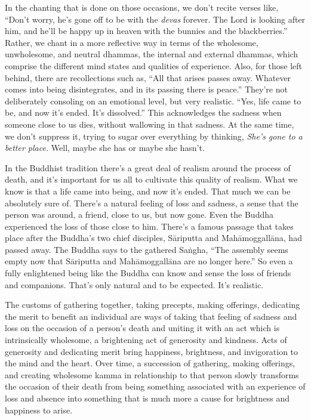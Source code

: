 In the chanting that is done on those occasions, we don't recite verses 
like, ``Don't worry, he's gone off to be with the \emph{devas} forever. 
The Lord is looking after him, and he'll be happy up in heaven with the 
bunnies and the blackberries.'' Rather, we chant in a more reflective 
way in terms of the wholesome, unwholesome, and neutral dhammas, the 
internal and external dhammas, which comprise the different mind states 
and qualities of experience. Also, for those left behind, there are 
recollections such as, ``All that arises passes away. Whatever comes 
into being disintegrates, and in its passing there is peace.'' They're 
not deliberately consoling on an emotional level, but very realistic. 
``Yes, life came to be, and now it's ended. It's dissolved.'' This 
acknowledges the sadness when someone close to us dies, without 
wallowing in that sadness. At the same time, we don't suppress it, 
trying to sugar over everything by thinking, \emph{She's gone to a 
better place.} Well, maybe she has or maybe she hasn't.

In the Buddhist tradition there's a great deal of realism around the 
process of death, and it's important for us all to cultivate this 
quality of realism. What we know is that a life came into being, and 
now it's ended. That much we can be absolutely sure of. There's a 
natural feeling of loss and sadness, a sense that the person was 
around, a friend, close to us, but now gone. Even the Buddha 
experienced the loss of those close to him. There's a famous passage 
that takes place after the Buddha's two chief disciples, Sāriputta and 
Mahāmoggallāna, had passed away. The Buddha says to the gathered 
Saṅgha, ``The assembly seems empty now that Sāriputta and 
Mahāmoggallāna are no longer here.'' So even a fully enlightened 
being like the Buddha can know and sense the loss of friends and 
companions. That's only natural and to be expected. It's realistic.

The customs of gathering together, taking precepts, making offerings, 
dedicating the merit to benefit an individual are ways of taking that 
feeling of sadness and loss on the occasion of a person's death and 
uniting it with an act which is intrinsically wholesome, a brightening 
act of generosity and kindness. Acts of generosity and dedicating merit 
bring happiness, brightness, and invigoration to the mind and the 
heart. Over time, a succession of gathering, making offerings, and 
creating wholesome kamma in relationship to that person slowly 
transforms the occasion of their death from being something associated 
with an experience of loss and absence into something that is much more 
a cause for brightness and happiness to arise.

